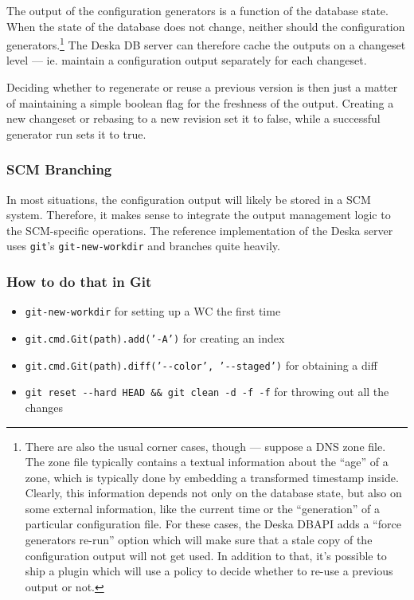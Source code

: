 \documentclass[deska]{subfiles}
\begin{document}
The output of the configuration generators is a function of the database state.  When the state of the database does not
change, neither should the configuration generators.\footnote{There are also the usual corner cases, though --- suppose a
DNS zone file.  The zone file typically contains a textual information about the ``age'' of a zone, which is typically
done by embedding a transformed timestamp inside.  Clearly, this information depends not only on the database state, but
also on some external information, like the current time or the ``generation'' of a particular configuration file.  For
these cases, the Deska DBAPI adds a ``force generators re-run'' option which will make sure that a stale copy of the
configuration output will not get used.  In addition to that, it's possible to ship a plugin which will use a policy to
decide whether to re-use a previous output or not.}  The Deska DB server can therefore cache the outputs on a changeset
level --- ie. maintain a configuration output separately for each changeset.

Deciding whether to regenerate or reuse a previous version is then just a matter of maintaining a simple boolean flag
for the freshness of the output.  Creating a new changeset or rebasing to a new revision set it to false, while a
successful generator run sets it to true.

\subsubsection{SCM Branching}

In most situations, the configuration output will likely be stored in a SCM system.  Therefore, it makes sense to
integrate the output management logic to the SCM-specific operations.  The reference implementation of the Deska server
uses {\tt git}'s {\tt git-new-workdir} and branches quite heavily.

\subsubsection{How to do that in Git}
\label{sec:cfggen-git}

\begin{itemize}
    \item {\tt git-new-workdir} for setting up a WC the first time
    \item {\tt git.cmd.Git(path).add('-A')} for creating an index
    \item {\tt git.cmd.Git(path).diff('-{-}color', '-{-}staged')} for obtaining a diff
    \item {\tt git reset -{-}hard HEAD \&\& git clean -d -f -f} for throwing out all the changes
\end{itemize}
\end{document}
